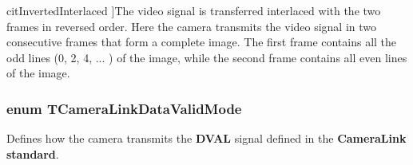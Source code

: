 \begin{Desc}
\begin{description}
{\hypertarget{group___device_specific_interface_gga88ebb3c75921a96f51a3ea81ba253466ac93bd7ca9a3bbffbbb90cfd49312b8ed}{cit\+Inverted\+Interlaced}\label{group___device_specific_interface_gga88ebb3c75921a96f51a3ea81ba253466ac93bd7ca9a3bbffbbb90cfd49312b8ed}
}]The video signal is transferred interlaced with the two frames in reversed order. Here the camera transmits the video signal in two consecutive frames that form a complete image. The first frame contains all the odd lines (0, 2, 4, ... ) of the image, while the second frame contains all even lines of the image. \end{description}
\end{Desc}
\hypertarget{group___device_specific_interface_gab4d89af185da36c227fc9dc396e97e9f}{
\subsubsection[{T\+Camera\+Link\+Data\+Valid\+Mode}]{\setlength{\rightskip}{0pt plus 5cm}enum {\bf T\+Camera\+Link\+Data\+Valid\+Mode}}}\label{group___device_specific_interface_gab4d89af185da36c227fc9dc396e97e9f}


Defines how the camera transmits the {\bfseries D\+V\+A\+L} signal defined in the {\bfseries Camera\+Link\textregistered{} standard}. 

